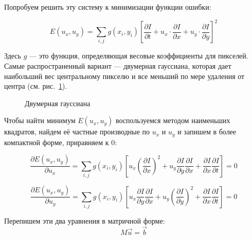 Попробуем решить эту систему к минимизации функции ошибки:

$$
E(u_x, u_y) = \sum \limits_{i,j} g(x_i, y_i) 
\left[ \frac{\partial I}{\partial t} + 
u_x \cdot \frac{\partial I}{\partial x} + 
u_y \cdot \frac{\partial I}{\partial y} \right]^2
$$

Здесь $g$ — это функция, определяющая весовые коэффициенты для пикселей. Самые распространенный вариант — двумерная гауссиана, которая дает наибольший вес центральному пикселю и все меньший по мере удаления от центра (см. рис.~\ref{pic:Gaussian2d}).

\begin{figure}[!htb]
\caption{Двумерная гауссиана}
\label{pic:Gaussian2d}
\end{figure}

Чтобы найти минимум  $E(u_x, u_y)$ воспользуемся методом наименьших квадратов, найдем её частные производные по $u_x$ и $u_y$ и запишем в более компактной форме, приравняем к 0:

$$
\frac{\partial E(u_x, u_y) }{\partial u_x} = 
\sum \limits_{i,j} g(x_i, y_i) 
\left[
u_x \left( \frac{\partial I}{\partial x} \right)^2 +
	u_y \frac{\partial I}{\partial y}\frac{\partial I}{\partial x} +
	\frac{\partial I}{\partial x}\frac{\partial I}{\partial t}
\right] = 0
$$

$$
\frac{\partial E(u_x, u_y) }{\partial u_y} = 
\sum \limits_{i,j} g(x_i, y_i) 
\left[
	u_x \frac{\partial I}{\partial y}\frac{\partial I}{\partial x} +
	u_y \left( \frac{\partial I}{\partial y} \right)^2 +
	\frac{\partial I}{\partial x}\frac{\partial I}{\partial t}
\right] = 0
$$

Перепишем эти два уравнения в матричной форме:
$$ M \vec{u} = \vec{b}$$

